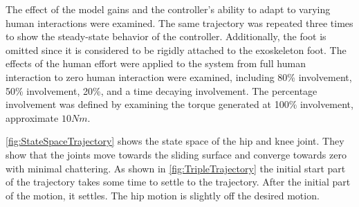 The effect of the model gains and the controller's ability to adapt to varying human interactions were examined. The same trajectory was repeated three times to show the steady-state behavior of the controller. Additionally, the foot is omitted since it is considered to be rigidly attached to the exoskeleton foot. 
The effects of the human effort were applied to the system from full human interaction to zero human interaction were examined, including 80\% involvement, 50\% involvement, 20\%, and a time decaying involvement. The percentage involvement was defined by examining the torque generated at 100\% involvement, approximate $10Nm$. 

\autoref{fig:StateSpaceTrajectory} shows the state space of the hip and knee joint. They show that the joints move towards the sliding surface and converge towards zero with minimal chattering.  As shown in \autoref{fig:TripleTrajectory} the initial start part of the trajectory takes some time to settle to the trajectory. After the initial part of the motion, it settles. The hip motion is slightly off the desired motion. 




